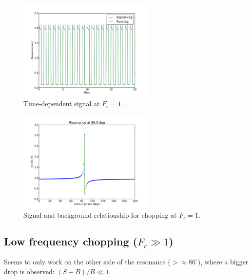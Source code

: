 \documentclass[10pt,a4paper]{article}
\begin{document}
\begin{figure}[h]
\centering
\includegraphics[width=0.6\textwidth]{figures/cpt01_0.pdf}
\caption{Time-dependent signal at $F_c = 1$.}
\label{fig:choptime1}
\end{figure}
\begin{figure}[h]
\centering
\includegraphics[width=0.6\textwidth]{figures/cpt01_3.pdf}
\caption{Signal and background relationship for chopping at $F_c = 1$.}
\label{fig:chopphase1}
\end{figure}


\subsection{Low frequency chopping ($F_c \gg 1$)}
  Seems to only work on the other side of the resonance ($> \approx 86^{\circ}$), where a bigger drop is observed: $(S + B) / B \ll 1$.
\end{document}
